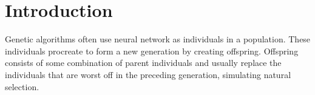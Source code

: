 \section{Introduction}
Genetic algorithms often use neural network as individuals in a population. These individuals procreate to form a new generation by creating offspring. Offspring consists of some combination of parent individuals and usually replace the individuals that are worst off in the preceding generation, simulating natural selection.
